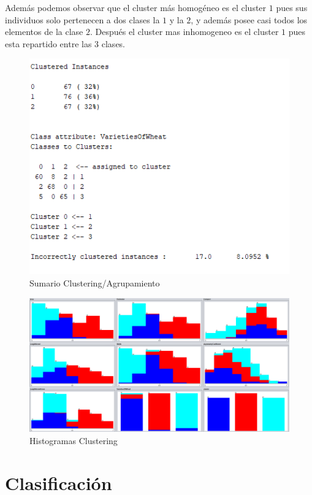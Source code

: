 \documentclass[a4paper, 11pt, twoside, openany, onecolumn, final]{memoir}
\begin{document}
Además podemos observar que el cluster más homogéneo es el cluster $1$ pues sus individuos solo pertenecen a dos clases la $1$ y la $2$, y además posee casi todos los elementos de la clase $2$. Después el cluster mas inhomogeneo es el cluster $1$ pues esta repartido entre las $3$ clases. 


	\begin{figure}
  		\centering
   		\includegraphics{Imagenes/SumarioClustering}
  		\caption{Sumario Clustering/Agrupamiento}
  		\label{SumarioClustering}
	\end{figure}	
	
	\begin{figure}
  		\centering
   		\includegraphics[width=1\textwidth]{Imagenes/Clustering}
  		\caption{Histogramas Clustering}
  		\label{ClusteringHistogramas}
	\end{figure}
	\chapter{Clasificación}
\end{document}
